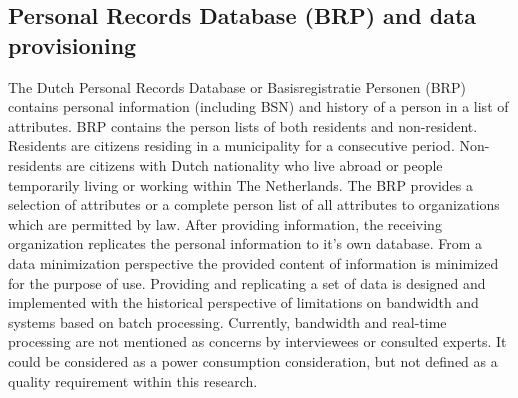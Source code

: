 \subsection{Personal Records Database (BRP) and data provisioning}\label{BRP}
The Dutch Personal Records Database or Basisregistratie Personen (BRP) contains personal information (including BSN) and history of a person in a list of attributes. BRP contains the person lists of both residents and non-resident. Residents are citizens residing in a municipality for a consecutive period. Non-residents are citizens with Dutch nationality who live abroad or people temporarily living or working within The Netherlands. \cite{BRP} The BRP provides a selection of attributes or a complete person list of all attributes to organizations which are permitted by law. After providing information, the receiving organization replicates the personal information to it's own database. From a data minimization perspective the provided content of information is minimized for the purpose of use.  
Providing and replicating a set of data is designed and implemented with the historical perspective of limitations on bandwidth and systems based on batch processing. Currently, bandwidth and real-time processing are not mentioned as concerns by interviewees or consulted experts. It could be considered as a power consumption consideration, but not defined as a quality requirement within this research.

